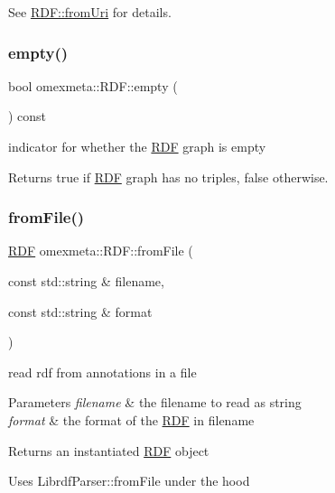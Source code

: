 See \hyperlink{classomexmeta_1_1RDF_a03906aa5c3b9429a2afdbe0ad2be21e6}{R\+D\+F\+::from\+Uri} for details. \mbox{\label{classomexmeta_1_1RDF_ab6525e8db606ffd48425b05ad2a204d8}} 
\subsubsection{\texorpdfstring{empty()}{empty()}}
{\footnotesize\ttfamily bool omexmeta\+::\+R\+D\+F\+::empty (\begin{DoxyParamCaption}{ }\end{DoxyParamCaption}) const}



indicator for whether the \hyperlink{classomexmeta_1_1RDF}{R\+DF} graph is empty 

\begin{DoxyReturn}{Returns}
true if \hyperlink{classomexmeta_1_1RDF}{R\+DF} graph has no triples, false otherwise. 
\end{DoxyReturn}
\mbox{\label{classomexmeta_1_1RDF_a98a1da84161a7935bf38ec5e5d34e91f}} 
\subsubsection{\texorpdfstring{from\+File()}{fromFile()}}
{\footnotesize\ttfamily \hyperlink{classomexmeta_1_1RDF}{R\+DF} omexmeta\+::\+R\+D\+F\+::from\+File (\begin{DoxyParamCaption}\item[{const std\+::string \&}]{filename,  }\item[{const std\+::string \&}]{format }\end{DoxyParamCaption})\hspace{0.3cm}{\ttfamily [static]}}



read rdf from annotations in a file 


\begin{DoxyParams}{Parameters}
{\em filename} & the filename to read as string \\
\hline
{\em format} & the format of the \hyperlink{classomexmeta_1_1RDF}{R\+DF} in filename \\
\hline
\end{DoxyParams}
\begin{DoxyReturn}{Returns}
an instantiated \hyperlink{classomexmeta_1_1RDF}{R\+DF} object
\end{DoxyReturn}
Uses Librdf\+Parser\+::from\+File under the hood \mbox{\label{classomexmeta_1_1RDF_a9d91b3134cdcc6dfef6d62b7b09d8da2}} 
